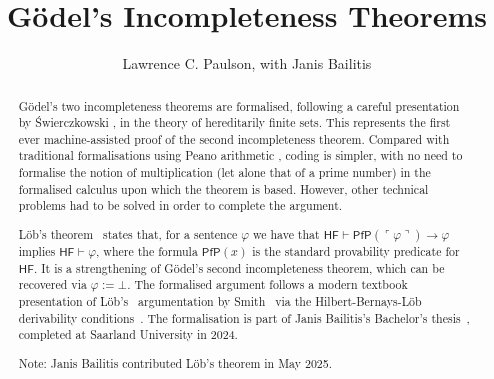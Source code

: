 \documentclass[11pt,a4paper]{report}
\begin{document}
\title{G\"odel's Incompleteness Theorems}
\author{Lawrence C. Paulson, with Janis Bailitis}
\maketitle

\begin{abstract}
G\"odel's two incompleteness theorems \cite{goedel-I} are formalised, following a careful presentation by {\'S}wierczkowski \cite{swierczkowski-finite}, in the theory of hereditarily finite sets. This represents the first ever machine-assisted proof of the second incompleteness theorem. Compared with traditional formalisations using Peano arithmetic \cite{boolos-provability}, coding is simpler, with no need to formalise the notion of multiplication (let alone that of a prime number) in the formalised calculus upon which the theorem is based.
However, other technical problems had to be solved in order to complete the argument.

L\"{o}b's theorem~\cite{loeb1955} states that, for a sentence $\varphi$ we have that $\mathsf{HF} \vdash \mathsf{PfP}(\ulcorner \varphi \urcorner) \rightarrow \varphi$ implies $\mathsf{HF} \vdash \varphi$, where the formula $\mathsf{PfP}(x)$ is the standard provability predicate for $\mathsf{HF}$. It is a strengthening of G\"{o}del's second incompleteness theorem, which can be recovered via $\varphi := \bot$. The formalised argument follows a modern textbook presentation of L\"{o}b's~\cite{loeb1955} argumentation by Smith~\cite[pp.~255]{smith2020} via the Hilbert-Bernays-L\"{o}b derivability conditions~\cite{hilbert1939,loeb1955}. 
The formalisation is part of Janis Bailitis's Bachelor's thesis~\cite{bailitis2024}, completed at Saarland University in 2024.

Note: Janis Bailitis contributed L\"{o}b's theorem in May 2025.
\end{abstract}

\tableofcontents





\end{document}
